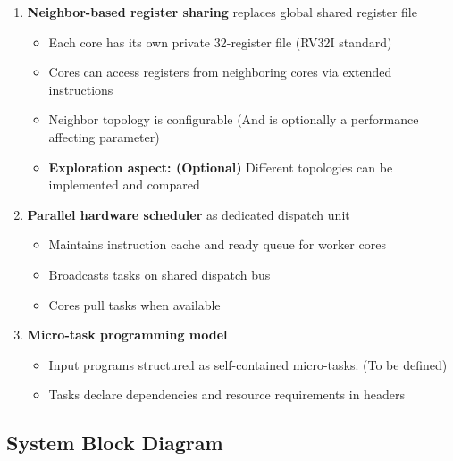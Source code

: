 \documentclass[a4paper,12pt]{article}
\begin{document}
\begin{enumerate}[leftmargin=*, itemsep=0.3em]
    \item \textbf{\color{accentorange}Neighbor-based register sharing} replaces global shared register file
    \begin{itemize}
        \item Each core has its own private 32-register file (RV32I standard)
        \item Cores can access registers from neighboring cores via extended instructions
        \item Neighbor topology is configurable (And is optionally a performance affecting parameter)
        \item \textbf{Exploration aspect: (Optional)} Different topologies can be implemented and compared
    \end{itemize}   
    
    \item \textbf{\color{accentorange}Parallel hardware scheduler} as dedicated dispatch unit
    \begin{itemize}
        \item Maintains instruction cache and ready queue for worker cores
        \item Broadcasts tasks on shared dispatch bus
        \item Cores pull tasks when available
    \end{itemize}
    
    \item \textbf{\color{accentorange}Micro-task programming model}
    \begin{itemize}
        \item Input programs structured as self-contained micro-tasks. (To be defined)
        \item Tasks declare dependencies and resource requirements in headers 
    \end{itemize}
\end{enumerate}

\subsection*{System Block Diagram}
\end{document}
